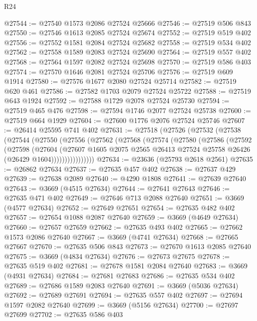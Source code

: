 \begin{lexlean}{R24}
\begin{coremodule}
@27544 := @27540 @1573 @2086 @27524 @25666
@27546 := @27519 @506 @843
@27550 := @27546 @1613 @2085 @27524 @25674
@27552 := @27519 @519 @402
@27556 := @27552 @1581 @2084 @27524 @25682
@27558 := @27519 @534 @402
@27562 := @27558 @1589 @2083 @27524 @25690
@27564 := @27519 @557 @402
@27568 := @27564 @1597 @2082 @27524 @25698
@27570 := @27519 @586 @403
@27574 := @27570 @1646 @2081 @27524 @25706
@27576 := @27519 @609 @1914
@27580 := @27576 @1677 @2080 @27524 @25714
@27582 := @27519 @620 @461
@27586 := @27582 @1703 @2079 @27524 @25722
@27588 := @27519 @643 @1924
@27592 := @27588 @1729 @2078 @27524 @25730
@27594 := @27519 @465 @476
@27598 := @27594 @1746 @2077 @27524 @25738
@27600 := @27519 @664 @1929
@27604 := @27600 @1776 @2076 @27524 @25746
@27607 := @26414 @25595 @741 @402
@27631 := @27518
    (@27526
      (@27532
        (@27538
          (@27544
            (@27550
              (@27556
                (@27562
                  (@27568
                    (@27574
                      (@27580
                        (@27586
                          (@27592
                            (@27598
                              (@27604
                                (@27607
                                  @1605
                                  @2075
                                  @2565
                                  @26413
                                  @27524
                                  @25758
                                  @26426
                                  (@26429 @1604))))))))))))))))
@27634 := @23636 (@25793 @2618 @2561)
@27635 := @26862 @27634
@27637 := @27635 @457 @402
@27638 := @27637 @429
@27639 := @27638 @2089
@27640 := @4290 @1808
@27641 := @27639 @27640
@27643 := @3669 (@4515 @27634)
@27644 := @27641 @27643
@27646 := @27635 @471 @402
@27649 := @27646 @713 @2088 @27640
@27651 := @3669 (@4577 @27634)
@27652 := @27649 @27651
@27654 := @27635 @482 @402
@27657 := @27654 @1088 @2087 @27640
@27659 := @3669 (@4649 @27634)
@27660 := @27657 @27659
@27662 := @27635 @493 @402
@27665 := @27662 @1573 @2086 @27640
@27667 := @3669 (@4741 @27634)
@27668 := @27665 @27667
@27670 := @27635 @506 @843
@27673 := @27670 @1613 @2085 @27640
@27675 := @3669 (@4834 @27634)
@27676 := @27673 @27675
@27678 := @27635 @519 @402
@27681 := @27678 @1581 @2084 @27640
@27683 := @3669 (@4931 @27634)
@27684 := @27681 @27683
@27686 := @27635 @534 @402
@27689 := @27686 @1589 @2083 @27640
@27691 := @3669 (@5036 @27634)
@27692 := @27689 @27691
@27694 := @27635 @557 @402
@27697 := @27694 @1597 @2082 @27640
@27699 := @3669 (@5156 @27634)
@27700 := @27697 @27699
@27702 := @27635 @586 @403

\end{coremodule}
\end{lexlean}
